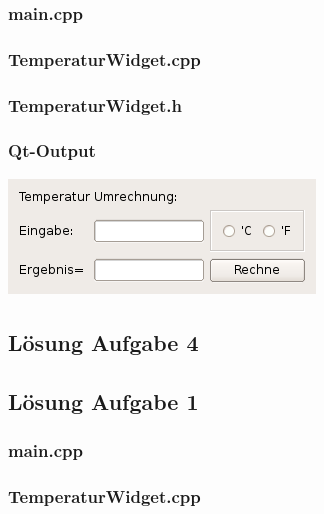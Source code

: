 \subsubsection{main.cpp}

\subsubsection{TemperaturWidget.cpp}

\subsubsection{TemperaturWidget.h}

\subsubsection{Qt-Output}
\begin{center}
	\includegraphics[scale=.5]{./images/u13a3.png}
\end{center}

\subsection{Lösung Aufgabe 4}


\setcounter{section}{14}
\setcounter{subsection}{1}

\subsection{Lösung Aufgabe 1}
\subsubsection{main.cpp}

\subsubsection{TemperaturWidget.cpp}

